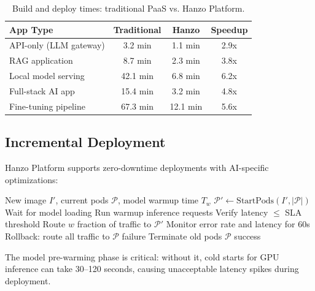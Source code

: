 \documentclass[11pt,twocolumn]{article}
\begin{document}
\begin{table}[H]
\centering
\small
\begin{tabular}{lccc}
\toprule
\textbf{App Type} & \textbf{Traditional} & \textbf{Hanzo} & \textbf{Speedup} \\
\midrule
API-only (LLM gateway) & 3.2 min & 1.1 min & 2.9x \\
RAG application & 8.7 min & 2.3 min & 3.8x \\
Local model serving & 42.1 min & 6.8 min & 6.2x \\
Full-stack AI app & 15.4 min & 3.2 min & 4.8x \\
Fine-tuning pipeline & 67.3 min & 12.1 min & 5.6x \\
\bottomrule
\end{tabular}
\caption{Build and deploy times: traditional PaaS vs. Hanzo Platform.}
\label{tab:build_times}
\end{table}

\subsection{Incremental Deployment}

Hanzo Platform supports zero-downtime deployments with AI-specific optimizations:

\begin{algorithm}[H]
\caption{AI-Aware Rolling Deployment}
\label{alg:deploy}
\begin{algorithmic}[1]
\Require New image $I'$, current pods $\mathcal{P}$, model warmup time $T_w$
\State {}
\State $\mathcal{P}' \gets \text{StartPods}(I', |\mathcal{P}|)$
    \State Wait for model loading
    \State Run warmup inference requests
    \State Verify latency $\le$ SLA threshold
\EndFor
\State {}
    \State Route $w$ fraction of traffic to $\mathcal{P}'$
    \State Monitor error rate and latency for 60s
        \State Rollback: route all traffic to $\mathcal{P}$
        \State \Return failure
    \EndIf
\EndFor
\State {}
\State Terminate old pods $\mathcal{P}$
\State \Return success
\end{algorithmic}
\end{algorithm}

The model pre-warming phase is critical: without it, cold starts for GPU inference can take 30--120 seconds, causing unacceptable latency spikes during deployment.
\end{document}
